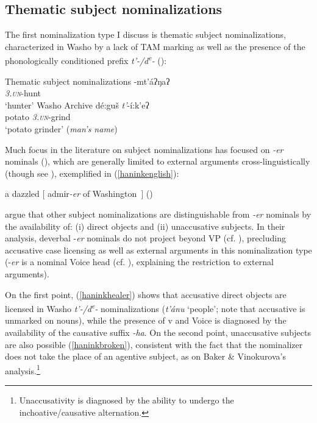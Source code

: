 \documentclass[output=paper]{langscibook}
\begin{document}
\subsection{Thematic subject nominalizations}

The first nominalization type I discuss is thematic subject nominalizations, characterized in Washo by a lack of TAM marking as well as the presence of the phonologically conditioned prefix {\itshape t'-/d\textsuperscript{e}-} (\citealt{jacobsen1964}):

\ea Thematic subject nominalizations
\ea {}-mt'áʔŋaʔ\\
\textit{\textsc{3.un}}-hunt\\
\glt `hunter' \hfill Washo Archive
\ex \gll dé:guš {\itshape t'}-í:k'eʔ\\
potato \textit{\textsc{3.un}}-grind\\
\glt `potato grinder' ({\itshape man's name}) \hfill \citep[354]{jacobsen1964}
\z
\z

Much focus in the literature on subject nominalizations has focused on {\itshape -er} nominals (\citealt{rappaporthovavlevin1992,bakervinokurova2009,alexiadouschafer2010}), which are generally limited to external arguments cross-lin\-guis\-ti\-cal\-ly (though see \citealt{alexiadouschafer2008,alexiadouschafer2010}), exemplified in (\ref{haninkenglish}):

\ea a dazzled $[$ admir{\itshape -er} of Washington\ $]$  \hfill (\citealt{rappaporthovavlevin1992})\label{haninkenglish}
\z 



\noindent\citet{bakervinokurova2009} argue that other subject nominalizations are distinguishable from {\itshape -er} nominals by the availability of: (i) direct objects and (ii) unaccusative subjects. In their analysis, deverbal -{\itshape er} nominals do not project beyond VP (cf. \citealt{alexiadouschafer2010}), precluding accusative case licensing as well as external arguments in this nominalization type  (-{\itshape er} is a nominal Voice head (cf. \citealt{kratzer1996}), explaining the restriction to external arguments). 

On the first point, (\ref{haninkhealer}) shows that accusative direct objects are licensed in Washo  {\itshape t'-/d\textsuperscript{e}-} nominalizations ({\itshape t'ánu} `people'; note that accusative is unmarked on nouns), while the presence of v and Voice is diagnosed by the availability of the causative suffix {\itshape -ha}. On the second point, unaccusative subjects are also possible (\ref{haninkbroken}), consistent with the fact that the nominalizer does not take the place of an agentive subject, as on Baker \& Vinokurova's \citeyear{bakervinokurova2009} analysis.\footnote{Unaccusativity is diagnosed by the ability to undergo the inchoative/causative alternation.}
\end{document}

